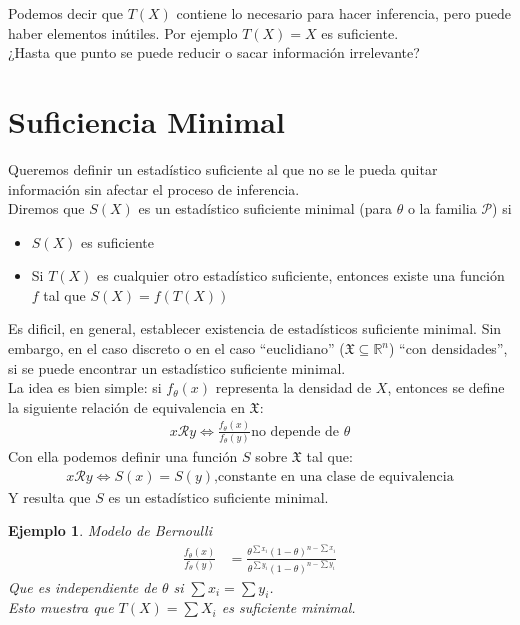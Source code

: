 \documentclass[10pt]{article}
\theoremstyle{plain}
\newtheorem{ej}{Ejemplo}
\theoremstyle{definition}
\begin{document}
Podemos decir que $T(X)$ contiene lo necesario para hacer inferencia, pero puede haber elementos inútiles. Por ejemplo $T(X) = X$ es suficiente.\\

¿Hasta que punto se puede reducir o sacar información irrelevante?

\section{Suficiencia Minimal}
Queremos definir un estadístico suficiente al que no se le pueda quitar información sin afectar el proceso de inferencia.\\

Diremos que $S(X)$ es un estadístico suficiente minimal (para $\theta$ o la familia $\mathcal{P}$) si
\begin{itemize}
\item $S(X)$ es suficiente
\item Si $T(X)$ es cualquier otro estadístico suficiente, entonces existe una función $f$ tal que $S(X) = f(T(X))$
\end{itemize}

Es dificil, en general, establecer existencia de estadísticos suficiente minimal. Sin embargo, en el caso discreto o en el caso ``euclidiano'' ($\mathfrak{X}\subseteq\mathbb{R}^n$) ``con densidades'', si se puede encontrar un estadístico suficiente minimal.\\

La idea es bien simple: si $f_{\theta}(x)$ representa la densidad de $X$, entonces se define la siguiente relación de equivalencia en $\mathfrak{X}$:
\begin{align*}
x\mathcal{R}y \Leftrightarrow \frac{f_{\theta}(x)}{f_{\theta}(y)} \text{no depende de $\theta$}
\end{align*}
Con ella podemos definir una función $S$ sobre $\mathfrak{X}$ tal que:
\begin{align*}
x\mathcal{R}y \Leftrightarrow S(x) = S(y) \text{,constante en una clase de equivalencia}
\end{align*}
Y resulta que $S$ es un estadístico suficiente minimal.

\begin{ej} Modelo de Bernoulli\\
\begin{align*}
\frac{f_{\theta}(x)}{f_{\theta}(y)} &= \frac{\theta^{\sum{x_{i}}}(1-\theta)^{n-\sum{x_{i}}}}{\theta^{\sum{y_{i}}}(1-\theta)^{n-\sum{y_{i}}}}
\end{align*}
Que es independiente de $\theta$ si $\sum{x_{i}}=\sum{y_{i}}$.\\
Esto muestra que $T(X) = \sum{X_{i}}$ es suficiente minimal.\\
\end{ej}
\end{document}
